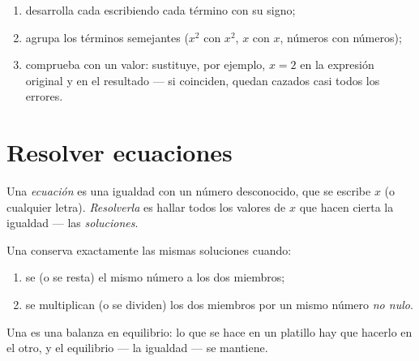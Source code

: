 \begin{method}\label{met:g8:equations:reduce}
\begin{enumerate}
  \item desarrolla cada  escribiendo cada término con su signo;
  \item agrupa los términos semejantes ($x^2$ con $x^2$, $x$ con $x$, números
        con números);
  \item comprueba con un valor: sustituye, por ejemplo, $x = 2$ en la expresión original
        y en el resultado --- si coinciden, quedan cazados casi todos los errores.
\end{enumerate}
\end{method}

\section{Resolver ecuaciones}

\begin{definition}[Ecuación]\label{def:g8:equations:def}
Una \emph{ecuación} es una igualdad con un número
desconocido, que se escribe $x$ (o cualquier letra). \emph{Resolverla} es hallar
todos los valores de $x$ que hacen cierta la igualdad --- las
\emph{soluciones}.
\end{definition}

\begin{theorem}\label{thm:g8:equations:balance}
Una  conserva exactamente las mismas soluciones cuando:
\begin{enumerate}
  \item se  (o se resta) el mismo número a los dos miembros;
  \item se multiplican (o se dividen) los dos miembros por un mismo
        número \emph{no nulo}.
\end{enumerate}
\end{theorem}
\admitted

\begin{omfigure}

{\small Una  es una balanza en equilibrio: lo que se hace en un platillo
hay que hacerlo en el otro, y el equilibrio --- la igualdad ---
se mantiene.}
\end{omfigure}


